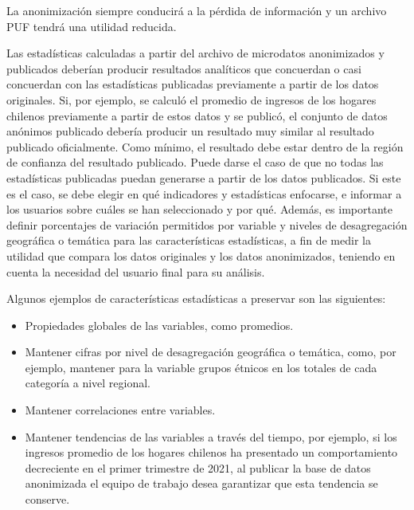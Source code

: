 \documentclass[]{book}
\providecommand{\tightlist}{%
  \setlength{\itemsep}{0pt}\setlength{\parskip}{0pt}}
\theoremstyle{definition}
\theoremstyle{definition}
\theoremstyle{definition}
\theoremstyle{definition}
\theoremstyle{remark}
\begin{document}
La anonimización siempre conducirá a la pérdida de información y un archivo PUF tendrá una utilidad reducida.

Las estadísticas calculadas a partir del archivo de microdatos anonimizados y publicados deberían producir resultados analíticos que concuerdan o casi concuerdan con las estadísticas publicadas previamente a partir de los datos originales. Si, por ejemplo, se calculó el promedio de ingresos de los hogares chilenos previamente a partir de estos datos y se publicó, el conjunto de datos anónimos publicado debería producir un resultado muy similar al resultado publicado oficialmente. Como mínimo, el resultado debe estar dentro de la región de confianza del resultado publicado. Puede darse el caso de que no todas las estadísticas publicadas puedan generarse a partir de los datos publicados. Si este es el caso, se debe elegir en qué indicadores y estadísticas enfocarse, e informar a los usuarios sobre cuáles se han seleccionado y por qué. Además, es importante definir porcentajes de variación permitidos por variable y niveles de desagregación geográfica o temática para las características estadísticas, a fin de medir la utilidad que compara los datos originales y los datos anonimizados, teniendo en cuenta la necesidad del usuario final para su análisis.

Algunos ejemplos de características estadísticas a preservar son las siguientes:

\begin{itemize}
\tightlist
\item
  Propiedades globales de las variables, como promedios.
\item
  Mantener cifras por nivel de desagregación geográfica o temática, como, por ejemplo, mantener para la variable grupos étnicos en los totales de cada categoría a nivel regional.
\item
  Mantener correlaciones entre variables.
\item
  Mantener tendencias de las variables a través del tiempo, por ejemplo, si los ingresos promedio de los hogares chilenos ha presentado un comportamiento decreciente en el primer trimestre de 2021, al publicar la base de datos anonimizada el equipo de trabajo desea garantizar que esta tendencia se conserve.
\end{itemize}
\end{document}
